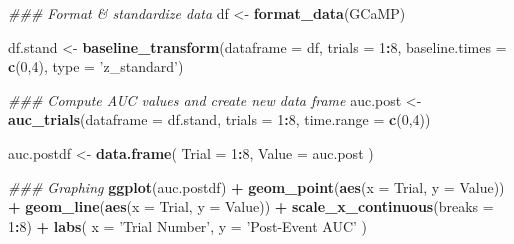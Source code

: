 \documentclass[
]{book}
\newenvironment{Shaded}{\begin{snugshade}}{\end{snugshade}}
\newcommand{\CommentTok}[1]{\textcolor[rgb]{0.56,0.35,0.01}{\textit{#1}}}
\newcommand{\DataTypeTok}[1]{\textcolor[rgb]{0.13,0.29,0.53}{#1}}
\newcommand{\DecValTok}[1]{\textcolor[rgb]{0.00,0.00,0.81}{#1}}
\newcommand{\KeywordTok}[1]{\textcolor[rgb]{0.13,0.29,0.53}{\textbf{#1}}}
\newcommand{\NormalTok}[1]{#1}
\newcommand{\OperatorTok}[1]{\textcolor[rgb]{0.81,0.36,0.00}{\textbf{#1}}}
\newcommand{\StringTok}[1]{\textcolor[rgb]{0.31,0.60,0.02}{#1}}
\begin{document}
\begin{Shaded}
\begin{Highlighting}[]
\CommentTok{### Format & standardize data}
\NormalTok{df <-}\StringTok{ }\KeywordTok{format_data}\NormalTok{(GCaMP)}

\NormalTok{df.stand <-}\StringTok{ }\KeywordTok{baseline_transform}\NormalTok{(}\DataTypeTok{dataframe =}\NormalTok{ df, }\DataTypeTok{trials =} \DecValTok{1}\OperatorTok{:}\DecValTok{8}\NormalTok{,}
                               \DataTypeTok{baseline.times =} \KeywordTok{c}\NormalTok{(}\DecValTok{0}\NormalTok{,}\DecValTok{4}\NormalTok{),}
                               \DataTypeTok{type =} \StringTok{'z_standard'}\NormalTok{)}
\end{Highlighting}
\end{Shaded}

\begin{Shaded}
\begin{Highlighting}[]
\CommentTok{### Compute AUC values and create new data frame}
\NormalTok{auc.post <-}\StringTok{ }\KeywordTok{auc_trials}\NormalTok{(}\DataTypeTok{dataframe =}\NormalTok{ df.stand, }\DataTypeTok{trials =} \DecValTok{1}\OperatorTok{:}\DecValTok{8}\NormalTok{,}
                       \DataTypeTok{time.range =} \KeywordTok{c}\NormalTok{(}\DecValTok{0}\NormalTok{,}\DecValTok{4}\NormalTok{))}

\NormalTok{auc.postdf <-}\StringTok{ }\KeywordTok{data.frame}\NormalTok{(}
  \DataTypeTok{Trial =} \DecValTok{1}\OperatorTok{:}\DecValTok{8}\NormalTok{,}
  \DataTypeTok{Value =}\NormalTok{ auc.post}
\NormalTok{)}
\end{Highlighting}
\end{Shaded}

\begin{Shaded}
\begin{Highlighting}[]
\CommentTok{### Graphing}
\KeywordTok{ggplot}\NormalTok{(auc.postdf) }\OperatorTok{+}
\StringTok{  }\KeywordTok{geom_point}\NormalTok{(}\KeywordTok{aes}\NormalTok{(}\DataTypeTok{x =}\NormalTok{ Trial, }\DataTypeTok{y =}\NormalTok{ Value)) }\OperatorTok{+}
\StringTok{  }\KeywordTok{geom_line}\NormalTok{(}\KeywordTok{aes}\NormalTok{(}\DataTypeTok{x =}\NormalTok{ Trial, }\DataTypeTok{y =}\NormalTok{ Value)) }\OperatorTok{+}
\StringTok{  }\KeywordTok{scale_x_continuous}\NormalTok{(}\DataTypeTok{breaks =} \DecValTok{1}\OperatorTok{:}\DecValTok{8}\NormalTok{) }\OperatorTok{+}
\StringTok{  }\KeywordTok{labs}\NormalTok{(}
    \DataTypeTok{x =} \StringTok{'Trial Number'}\NormalTok{,}
    \DataTypeTok{y =} \StringTok{'Post-Event AUC'}
\NormalTok{  )}
\end{Highlighting}
\end{Shaded}
\end{document}
